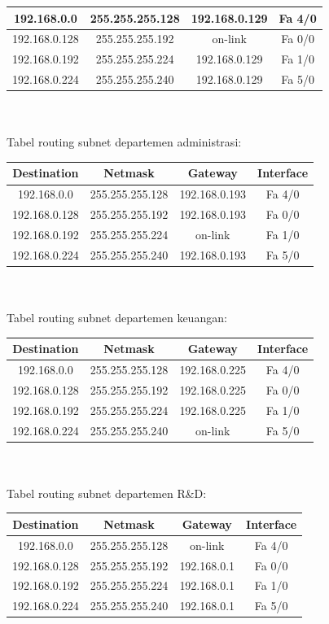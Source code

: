 \begin{enumerate}
\begin{tabular}{| c | c | c | c |}
		192.168.0.0 & 255.255.255.128 & 192.168.0.129 & Fa 4/0 \\
		\hline
		192.168.0.128 & 255.255.255.192 & on-link & Fa 0/0\\
		\hline
		192.168.0.192 & 255.255.255.224 & 192.168.0.129 & Fa 1/0\\
		\hline
		192.168.0.224 & 255.255.255.240 & 192.168.0.129 & Fa 5/0\\
		\hline
	\end{tabular}\\\\
	Tabel routing subnet departemen administrasi:\\
	\begin{tabular}{| c | c | c | c |}
		\hline
		Destination & Netmask & Gateway & Interface\\
		\hline
		192.168.0.0 & 255.255.255.128 & 192.168.0.193 & Fa 4/0 \\
		\hline
		192.168.0.128 & 255.255.255.192 & 192.168.0.193 & Fa 0/0\\
		\hline
		192.168.0.192 & 255.255.255.224 & on-link & Fa 1/0\\
		\hline
		192.168.0.224 & 255.255.255.240 & 192.168.0.193 & Fa 5/0\\
		\hline
	\end{tabular}\\\\
	Tabel routing subnet departemen keuangan:\\
	\begin{tabular}{| c | c | c | c |}
		\hline
		Destination & Netmask & Gateway & Interface\\
		\hline
		192.168.0.0 & 255.255.255.128 & 192.168.0.225 & Fa 4/0 \\
		\hline
		192.168.0.128 & 255.255.255.192 & 192.168.0.225 & Fa 0/0\\
		\hline
		192.168.0.192 & 255.255.255.224 & 192.168.0.225 & Fa 1/0\\
		\hline
		192.168.0.224 & 255.255.255.240 & on-link & Fa 5/0\\
		\hline
	\end{tabular}\\\\
	Tabel routing subnet departemen R\&D:\\
	\begin{tabular}{| c | c | c | c |}
		\hline
		Destination & Netmask & Gateway & Interface\\
		\hline
		192.168.0.0 & 255.255.255.128 & on-link & Fa 4/0 \\
		\hline
		192.168.0.128 & 255.255.255.192 & 192.168.0.1 & Fa 0/0\\
		\hline
		192.168.0.192 & 255.255.255.224 & 192.168.0.1 & Fa 1/0\\
		\hline
		192.168.0.224 & 255.255.255.240 & 192.168.0.1 & Fa 5/0\\
		\hline
	\end{tabular}\\\\
	

\end{enumerate}
